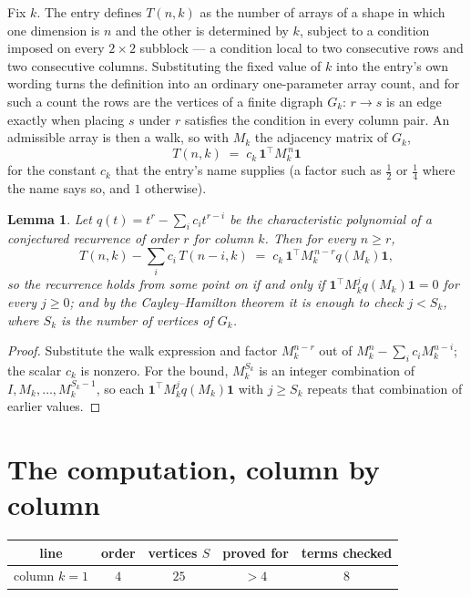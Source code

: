 \documentclass[11pt,a4paper]{article}
\theoremstyle{plain}
\newtheorem{lemma}[theorem]{Lemma}
\theoremstyle{definition}
\begin{document}
Fix $k$. The entry defines $T(n,k)$ as the number of arrays of a shape in which one dimension
is $n$ and the other is determined by $k$, subject to a condition imposed on every
$2\times2$ subblock --- a condition local to two consecutive rows and two consecutive columns.
Substituting the fixed value of $k$ into the entry's own wording turns the definition into an
ordinary one-parameter array count, and for such a count the rows are the vertices of a finite
digraph $G_k$: $r\to s$ is an edge exactly when placing $s$ under $r$ satisfies the condition
in every column pair. An admissible array is then a walk, so with $M_k$ the adjacency matrix
of $G_k$,
\[
T(n,k)\;=\;c_k\,\mathbf{1}^{\!\top}M_k^{\,n}\mathbf{1}
\]
for the constant $c_k$ that the entry's name supplies (a factor such as $\tfrac12$ or
$\tfrac14$ where the name says so, and $1$ otherwise).

\begin{lemma}\label{lem:crit}
Let $q(t)=t^{r}-\sum_i c_it^{r-i}$ be the characteristic polynomial of a conjectured
recurrence of order $r$ for column $k$. Then for every $n\ge r$,
\[
T(n,k)-\sum_i c_i\,T(n-i,k)\;=\;c_k\,\mathbf{1}^{\!\top}M_k^{\,n-r}q(M_k)\mathbf{1},
\]
so the recurrence holds from some point on if and only if
$\mathbf{1}^{\!\top}M_k^{j}q(M_k)\mathbf{1}=0$ for every $j\ge0$; and by the
Cayley--Hamilton theorem it is enough to check $j<S_k$, where $S_k$ is the number of vertices
of $G_k$.
\end{lemma}

\begin{proof}
Substitute the walk expression and factor $M_k^{n-r}$ out of $M_k^{n}-\sum_ic_iM_k^{n-i}$;
the scalar $c_k$ is nonzero. For the bound, $M_k^{S_k}$ is an integer combination of
$I,M_k,\dots,M_k^{S_k-1}$, so each $\mathbf{1}^{\!\top}M_k^{j}q(M_k)\mathbf{1}$ with
$j\ge S_k$ repeats that combination of earlier values.
\end{proof}

\section{The computation, column by column}

\begin{center}
\begin{tabular}{ccccc}
line & order & vertices $S$ & proved for & terms checked \\ \hline
column $k$$=1$ & $4$ & $25$ & $>4$ & $8$ \\
\end{tabular}
\end{center}
\end{document}
